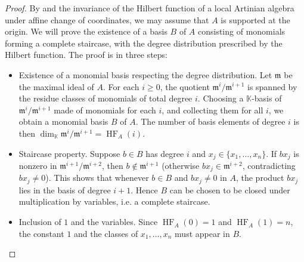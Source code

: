 \documentclass[a4paper,11p]{amsart}
\newcommand{\K}{\mathbb K}
\begin{document}
\begin{proof}
    By  and the invariance of the Hilbert function of a local Artinian algebra under affine change of coordinates, we may assume that $A$ is supported at the origin.  
    We will prove the existence of a basis $B$ of $A$ consisting of monomials forming a complete staircase, with the degree distribution prescribed by the Hilbert function. The proof is in three steps:

    \begin{itemize}
        \item Existence of a monomial basis respecting the degree distribution.  
        Let $\mathfrak{m}$ be the maximal ideal of $A$. For each $i \ge 0$, the quotient $\mathfrak{m}^i / \mathfrak{m}^{i+1}$ is spanned by the residue classes of monomials of total degree $i$.  
        Choosing a $\K$-basis of $\mathfrak{m}^i / \mathfrak{m}^{i+1}$ made of monomials for each $i$, and collecting them for all $i$, we obtain a monomial basis $B$ of $A$. The number of basis elements of degree $i$ is then $\dim_{\K} \mathfrak{m}^i / \mathfrak{m}^{i+1} = \operatorname{HF}_A(i)$.

        \item Staircase property.  
        Suppose $b \in B$ has degree $i$ and $x_j \in \{x_1,\ldots,x_n\}$. If $b x_j$ is nonzero in $\mathfrak{m}^{i+1}/\mathfrak{m}^{i+2}$, then $b \notin \mathfrak{m}^{i+1}$ (otherwise $b x_j \in \mathfrak{m}^{i+2}$, contradicting $b x_j \neq 0$).  
        This shows that whenever $b \in B$ and $b x_j \neq 0$ in $A$, the product $b x_j$ lies in the basis of degree $i+1$. Hence $B$ can be chosen to be closed under multiplication by variables, i.e. a complete staircase.

        \item Inclusion of $1$ and the variables.
        Since $\operatorname{HF}_A(0) = 1$ and $\operatorname{HF}_A(1) = n$, the constant $1$ and the classes of $x_1,\ldots,x_n$ must appear in $B$.
    \end{itemize}
\end{proof}
\end{document}
